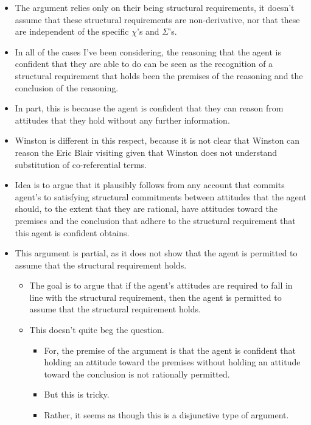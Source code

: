 \documentclass[10pt]{article}
\newcommand{\hozlinedash}[0]{%
  \noindent\hdashrule[0.5ex][c]{\textwidth}{.1pt}{2.5pt}
}
\begin{document}
\begin{itemize}
\item The argument relies only on their being structural requirements, it doesn't assume that these structural requirements are non-derivative, nor that these are independent of the specific \(\chi\)'s and \(\Sigma\)'s.
\end{itemize}


\hozlinedash

\begin{itemize}
\item In all of the cases I've been considering, the reasoning that the agent is confident that they are able to do can be seen as the recognition of a structural requirement that holds been the premises of the reasoning and the conclusion of the reasoning.
\item In part, this is because the agent is confident that they can reason from attitudes that they hold without any further information.
\item Winston is different in this respect, because it is not clear that Winston can reason the Eric Blair visiting given that Winston does not understand substitution of co-referential terms.
\item Idea is to argue that it plausibly follows from any account that commits agent's to satisfying structural commitments between attitudes that the agent should, to the extent that they are rational, have attitudes toward the premises and the conclusion that adhere to the structural requirement that this agent is confident obtains.
\item This argument is partial, as it does not show that the agent is permitted to assume that the structural requirement holds.
  \begin{itemize}
  \item The goal is to argue that if the agent's attitudes are required to fall in line with the structural requirement, then the agent is permitted to assume that the structural requirement holds.
  \item This doesn't quite beg the question.
    \begin{itemize}
    \item For, the premise of the argument is that the agent is confident that holding an attitude toward the premises without holding an attitude toward the conclusion is not rationally permitted.
    \item But this is tricky.
    \item Rather, it seems as though this is a disjunctive type of argument.

\end{itemize}
\end{itemize}
\end{itemize}
\end{document}
